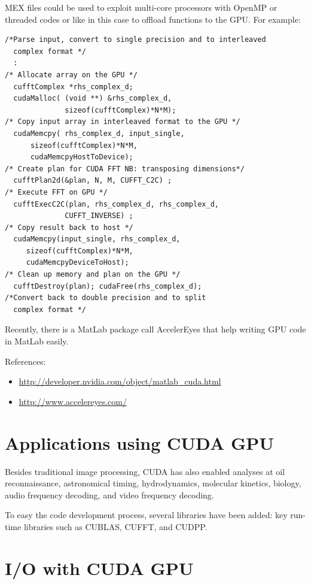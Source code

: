 MEX files could be used to exploit multi-core processors with OpenMP
or threaded codes or like in this case to offload functions to the
GPU. For example:
\begin{lstlisting}
/*Parse input, convert to single precision and to interleaved 
  complex format */
  :
/* Allocate array on the GPU */
  cufftComplex *rhs_complex_d;
  cudaMalloc( (void **) &rhs_complex_d,
              sizeof(cufftComplex)*N*M);
/* Copy input array in interleaved format to the GPU */
  cudaMemcpy( rhs_complex_d, input_single, 
      sizeof(cufftComplex)*N*M,
      cudaMemcpyHostToDevice);
/* Create plan for CUDA FFT NB: transposing dimensions*/
  cufftPlan2d(&plan, N, M, CUFFT_C2C) ;
/* Execute FFT on GPU */
  cufftExecC2C(plan, rhs_complex_d, rhs_complex_d, 
              CUFFT_INVERSE) ;
/* Copy result back to host */
  cudaMemcpy(input_single, rhs_complex_d, 
     sizeof(cufftComplex)*N*M,
     cudaMemcpyDeviceToHost);
/* Clean up memory and plan on the GPU */
  cufftDestroy(plan); cudaFree(rhs_complex_d);
/*Convert back to double precision and to split 
  complex format */
\end{lstlisting}

Recently, there is a MatLab package call AccelerEyes that help writing
GPU code in MatLab easily. 

References:
\begin{itemize}
\item \url{http://developer.nvidia.com/object/matlab_cuda.html}
\item \url{http://www.accelereyes.com/}
\end{itemize}

\section{Applications using CUDA GPU}
\label{sec:CUDA-application}

Besides traditional image processing, CUDA has also enabled analyses at oil
reconnaissance, astronomical timing, hydrodynamics, molecular kinetics, biology,
audio frequency decoding, and video frequency decoding.

To easy the code development process, several libraries have been added:
key run-time libraries such as CUBLAS, CUFFT, and CUDPP.
 
\section{I/O with CUDA GPU} 


